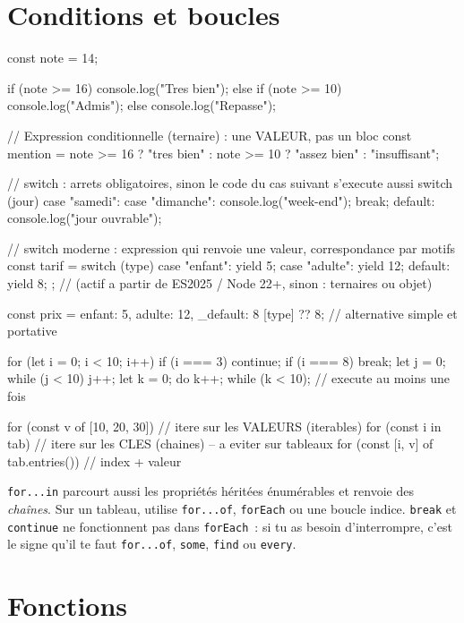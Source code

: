 \section{Conditions et boucles}

\begin{codejs}
const note = 14;

if (note >= 16)       console.log("Tres bien");
else if (note >= 10)  console.log("Admis");
else                  console.log("Repasse");

// Expression conditionnelle (ternaire) : une VALEUR, pas un bloc
const mention = note >= 16 ? "tres bien" : note >= 10 ? "assez bien" : "insuffisant";

// switch : arrets obligatoires, sinon le code du cas suivant s'execute aussi
switch (jour) {
  case "samedi":
  case "dimanche":
    console.log("week-end");
    break;
  default:
    console.log("jour ouvrable");
}

// switch moderne : expression qui renvoie une valeur, correspondance par motifs
const tarif = switch (type) {
  case "enfant":        yield 5;
  case "adulte":        yield 12;
  default:              yield 8;
};                      // (actif a partir de ES2025 / Node 22+, sinon : ternaires ou objet)

const prix = { enfant: 5, adulte: 12, _default: 8 }[type] ?? 8;  // alternative simple et portative

for (let i = 0; i < 10; i++) { if (i === 3) continue; if (i === 8) break; }
let j = 0; while (j < 10) { j++; }
let k = 0; do { k++; } while (k < 10);   // execute au moins une fois

for (const v of [10, 20, 30]) {}          // itere sur les VALEURS (iterables)
for (const i in tab) {}                    // itere sur les CLES (chaines) -- a eviter sur tableaux
for (const [i, v] of tab.entries()) {}     // index + valeur
\end{codejs}

\begin{piege}
\verb|for...in| parcourt aussi les propri\'et\'es h\'erit\'ees \'enum\'erables et renvoie des
\emph{cha\^ines}. Sur un tableau, utilise \verb|for...of|, \verb|forEach| ou une boucle
indice. \verb|break| et \verb|continue| ne fonctionnent pas dans \verb|forEach|~: si tu as besoin
d'interrompre, c'est le signe qu'il te faut \verb|for...of|, \verb|some|, \verb|find| ou \verb|every|.
\end{piege}

\section{Fonctions}

